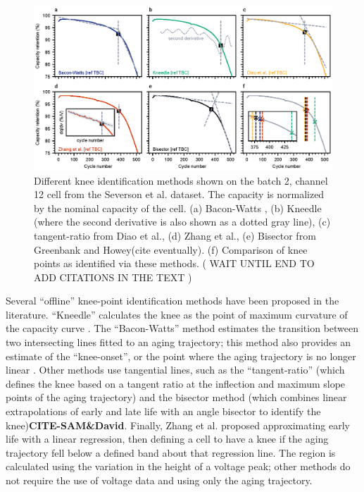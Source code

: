 \documentclass[journal=jpclcd,manuscript=article]{achemso}
\begin{document}
\begin{figure}[h!tb]
\centering
\includegraphics[scale=1]{figures/knee_identification_methods.eps}
\caption{Different knee identification methods shown on the batch 2, channel 12 cell from the Severson et al.\cite{severson_data-driven_2019} dataset. The capacity is normalized by the nominal capacity of the cell. (a) Bacon-Watts \cite{fermin-cueto_identification_2020}, (b) Kneedle (where the second derivative is also shown as a dotted gray line), (c) tangent-ratio from Diao et al.\cite{diao_algorithm_2019}, (d) Zhang et al.\cite{zhang_identifying_2020}, (e) Bisector from Greenbank and Howey(cite eventually). (f) Comparison of knee points as identified via these methods. 
(
WAIT UNTIL END TO ADD CITATIONS IN THE TEXT )}
\label{fig:knee_identification_methods}
\end{figure}

Several ``offline'' knee-point identification methods have been proposed in the literature.
``Kneedle'' calculates the knee as the point of maximum curvature of the capacity curve \cite{satopaa_finding_2011}. The ``Bacon-Watts'' method estimates the transition between two intersecting lines fitted to an aging trajectory; this method also provides an estimate of the ``knee-onset'', or the point where the aging trajectory is no longer linear \cite{fermin-cueto_identification_2020}. Other methods use tangential lines, such as the ``tangent-ratio'' (which defines the knee based on a tangent ratio at the inflection and maximum slope points of the aging trajectory)\cite{diao_algorithm_2019} and the bisector method (which combines linear extrapolations of early and late life with an angle bisector to identify the knee)\textbf{CITE-SAM\&David}. Finally, Zhang et al.\cite{zhang_accelerated_2019} proposed approximating early life with a linear regression, then defining a cell to have a knee if the aging trajectory fell below a defined band about that regression line. The region is calculated using the variation in the height of a voltage peak; other methods do not require the use of voltage data and using only the aging trajectory. 
\end{document}

